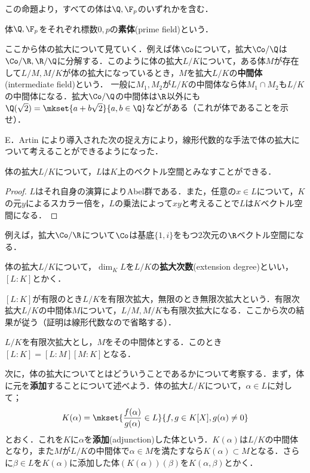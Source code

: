この命題より，すべての体は$\Q,\F_p$のいずれかを含む．

\begin{defi}[素体]
	体$\Q,\F_p$をそれぞれ標数$0,p$の\textbf{素体}(prime field)という．
\end{defi}

ここから体の拡大について見ていく．例えば体$\Co$について，拡大$\Co/\Q$は$\Co/\R,\R/\Q$に分解する．このように体の拡大$L/K$について，ある体$M$が存在して$L/M,M/K$が体の拡大になっているとき，$M$を拡大$L/K$の\textbf{中間体}(intermediate field)という． 一般に$M_1,M_2$が$L/K$の中間体なら体$M_1\cap M_2$も$L/K$の中間体になる．拡大$\Co/\Q$の中間体は$\R$以外にも$\Q(\sqrt{2})=\mkset{a+b\sqrt{2}}{a,b\in\Q}$などがある（これが体であることを示せ）．

E．Artin により導入された次の捉え方により，線形代数的な手法で体の拡大について考えることができるようになった．

\begin{prop}
	体の拡大$L/K$について，$L$は$K$上のベクトル空間とみなすことができる．
\end{prop}

\begin{proof}
	$L$はそれ自身の演算によりAbel群である．また，任意の$x\in L$について，$K$の元$y$によるスカラー倍を，$L$の乗法によって$xy$と考えることで$L$は$K$ベクトル空間になる．
\end{proof}

例えば，拡大$\Co/\R$について$\Co$は基底$\{1,i\}$をもつ$2$次元の$\R$ベクトル空間になる．

\begin{defi}[拡大次数]
	体の拡大$L/K$について，$\dim_K L$を$L/K$の\textbf{拡大次数}(extension degree)といい，$[L:K]$とかく．
\end{defi}

$[L:K]$が有限のとき$L/K$を有限次拡大，無限のとき無限次拡大という．有限次拡大$L/K$の中間体$M$について，$L/M,M/K$も有限次拡大になる．ここから次の結果が従う（証明は線形代数なので省略する）．

\begin{prop}
	$L/K$を有限次拡大とし，$M$をその中間体とする．このとき$[L:K]=[L:M][M:K]$となる．
\end{prop}

次に，体の拡大についてとはどういうことであるかについて考察する．まず，体に元を\textbf{添加}することについて述べよう．体の拡大$L/K$について，$\alpha\in L$に対して；
\[K(\alpha)=\mkset{\frac{f(\alpha)}{g(\alpha)}\in L}{f,g\in K[X],g(\alpha)\neq0}\]
とおく．これを$K$に$\alpha$を\textbf{添加}(adjunction)した体という．$K(\alpha)$は$L/K$の中間体となり，また$M$が$L/K$の中間体で$\alpha\in M$を満たすなら$K(\alpha)\subset M$となる．さらに$\beta\in L$を$K(\alpha)$に添加した体$(K(\alpha))(\beta)$を$K(\alpha,\beta)$とかく．

